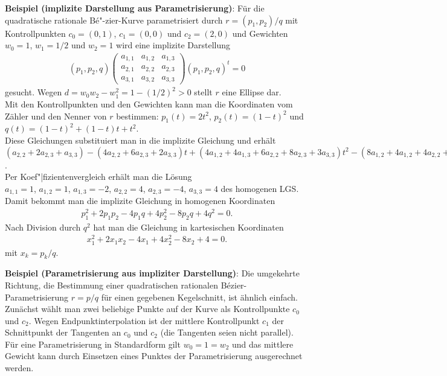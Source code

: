 \textbf{Beispiel (implizite Darstellung aus Parametrisierung)}:
Für die quadratische rationale Bé"-zier-Kurve parametrisiert durch $r = (p_1, p_2)/q$ mit
Kontrollpunkten $c_0 = (0, 1)$, $c_1 = (0, 0)$ und $c_2 = (2, 0)$ und Gewichten
$w_0 = 1$, $w_1 = 1/2$ und $w_2 = 1$ wird eine implizite Darstellung
\begin{align*}
    (p_1, p_2, q) \begin{pmatrix}a_{1,1} & a_{1,2} & a_{1,3}\\a_{2,1} & a_{2,2} & a_{2,3}\\
    a_{3,1} & a_{3,2} & a_{3,3}\end{pmatrix} (p_1, p_2, q)^t = 0
\end{align*}
gesucht.
Wegen $d = w_0 w_2 - w_1^2 = 1 - (1/2)^2 > 0$ stellt $r$ eine Ellipse dar.\\
Mit den Kontrollpunkten und den Gewichten kann man die Koordinaten vom Zähler und den Nenner
von $r$ bestimmen:
$p_1(t) = 2t^2$, $p_2(t) = (1 - t)^2$ und
$q(t) = (1 - t)^2 + (1 - t) t + t^2$.\\
Diese Gleichungen substituiert man in die implizite Gleichung und erhält
$(a_{2,2} + 2a_{2,3} + a_{3,3}) - (4a_{2,2} + 6a_{2,3} + 2a_{3,3}) t +
(4a_{1,2} + 4a_{1,3} + 6a_{2,2} + 8a_{2,3} + 3a_{3,3}) t^2 -
(8a_{1,2} + 4a_{1,2} + 4a_{2,2} + 6a_{2,3} + 2a_{3,3}) t^3 +
(4a_{1,1} + 4a_{1,2} + 4a_{1,3} + a_{2,2} + 2a_{2,3} + a_{3,3}) t^4 = 0$.\\
Per Koef"|fizientenvergleich erhält man die Lösung\\
$a_{1,1} = 1$, $a_{1,2} = 1$, $a_{1,3} = -2$, $a_{2,2} = 4$, $a_{2,3} = -4$, $a_{3,3} = 4$
des homogenen LGS.\\
Damit bekommt man die implizite Gleichung in homogenen Koordinaten
\begin{align*}
    p_1^2 + 2p_1p_2 - 4p_1q + 4p_2^2 - 8p_2q + 4q^2 = 0.
\end{align*}
Nach Division durch $q^2$ hat man die Gleichung in kartesischen Koordinaten
\begin{align*}
    x_1^2 + 2x_1x_2 - 4x_1 + 4x_2^2 - 8x_2 + 4 = 0.
\end{align*}
mit $x_k = p_k/q$.

\linie

\textbf{Beispiel (Parametrisierung aus impliziter Darstellung)}:
Die umgekehrte Richtung, die Bestimmung einer quadratischen rationalen Bézier-Parametrisierung
$r = p/q$ für einen gegebenen Kegelschnitt, ist ähnlich einfach.
Zunächst wählt man zwei beliebige Punkte auf der Kurve als Kontrollpunkte $c_0$ und $c_2$.
Wegen Endpunktinterpolation ist der mittlere Kontrollpunkt $c_1$ der Schnittpunkt der Tangenten
an $c_0$ und $c_2$ (die Tangenten seien nicht parallel).
Für eine Parametrisierung in Standardform gilt $w_0 = 1 = w_2$ und das mittlere Gewicht kann
durch Einsetzen eines Punktes der Parametrisierung ausgerechnet werden.

